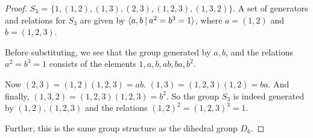 \documentclass{article}
\begin{document}
\begin{proof}
    $S_3$ = $\{1, (1, 2), (1, 3), (2, 3), (1, 2, 3), (1, 3, 2)\}$. A set of generators and relations for $S_3$ are given by $\langle a, b \hspace{0.5ex}|\hspace{0.5ex} a^2 = b^3 = 1 \rangle$, where $a = (1, 2)$ and $b = (1, 2, 3)$.

    Before substituting, we see that the group generated by $a, b$, and the relations $a^2 = b^3 = 1$ consists of the elements $1, a, b, ab, ba, b^2$.

    Now $(2, 3) = (1, 2)(1, 2, 3) = ab$. $(1, 3) = (1, 2, 3)(1, 2) = ba$. And finally, $(1, 3, 2) = (1, 2, 3)(1, 2, 3) = b^2$. So the group $S_3$ is indeed generated by $(1, 2), (1, 2, 3)$ and the relations $(1, 2)^2 = (1, 2, 3)^3 = 1$.

    Further, this is the same group structure as the dihedral group $D_6$.
\end{proof}
\end{document}
